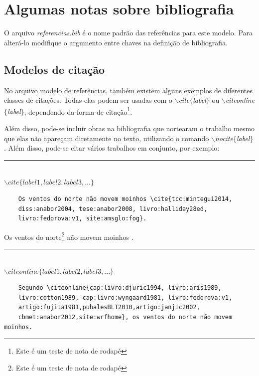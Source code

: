 \documentclass[oneside,openright,12pt]{ufsm_2015} %
\begin{document}
\chapter{Algumas notas sobre bibliografia}


\par O arquivo \textit{referencias.bib} é o nome padrão das referências para este modelo. Para alterá-lo modifique o argumento entre chaves na definição de bibliografia.

   \section{Modelos de citação}
      \par No arquivo modelo de referências, também existem alguns exemplos de diferentes classes de citações. Todas elas podem ser usadas com o \textit{$\backslash$cite$\{$label$\}$} ou \textit{$\backslash$citeonline$\{$label$\}$}, dependendo da forma de citação\footnote{Este é um teste de nota de rodapé}.

	\par Além disso, pode-se incluir obras na bibliografia que nortearam o trabalho mesmo que elas não apareçam diretamente no texto, utilizando o comando \textit{$\backslash$nocite$\{$label$\}$}. Além disso, pode-se citar vários trabalhos em conjunto, por exemplo:
	
	\begin{center}\rule{0.5\textwidth}{1pt}\\$\backslash cite\{label1,label2,label3,...\}$\end{center}

	\begin{verbatim}
	Os ventos do norte não movem moinhos \cite{tcc:mintegui2014, 
	diss:anabor2004, tese:anabor2008, livro:halliday28ed, 
	livro:fedorova:v1, site:amsglo:fog}.
	\end{verbatim}
	    
	\par Os ventos do norte\footnote{Este é um teste de nota de rodapé} não movem moinhos \cite{tcc:mintegui2014,diss:anabor2004,tese:anabor2008,livro:halliday28ed,livro:fedorova:v1,site:amsglo:fog}.
        
        \begin{center}\rule{0.5\textwidth}{1pt}\\$\backslash citeonline\{label1,label2,label3,...\}$\end{center}
        
	\begin{verbatim}
	Segundo \citeonline{cap:livro:djuric1994, livro:aris1989, 
	livro:cotton1989, cap:livro:wyngaard1981, livro:fedorova:v1, 
	artigo:fujita1981,puhalesBLT2010,artigo:janjic2002,
	cbmet:anabor2012,site:wrfhome}, os ventos do norte não movem moinhos.
	\end{verbatim}
            
\end{document}
